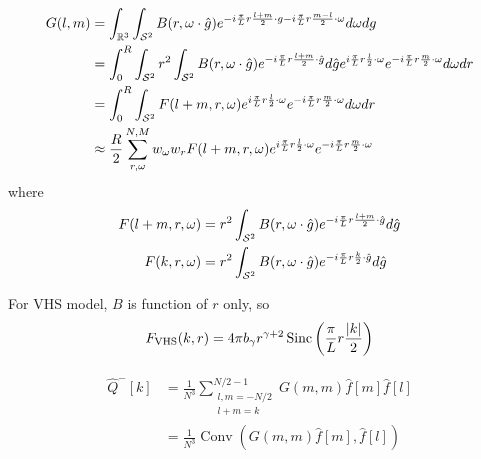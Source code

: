\documentclass[11pt]{amsart}
\begin{document}
\begin{align*}
\begin{split}
G(l,m)  &= \int_{\mathbb{R}^3} \int_{\mathcal{S}^2}B(r,\omega \cdot \hat g)  e^{-i{\pi \over L}r\frac{l+m}{2} \cdot g -i {\pi \over L} r \frac{m-l}{2}\cdot \omega}d\omega dg \\
& = \int_{0}^R \int_{\mathcal{S}^2}   r^2 \int_{\mathcal{S}^2} B(r,\omega \cdot \hat g) e^{-i{\pi \over L}r\frac{l+m}{2}\cdot \hat g}d\hat g e^{i {\pi \over L} r \frac{l}{2}\cdot \omega}e^{-i {\pi \over L} r \frac{m}{2}\cdot \omega}d\omega dr \\
& = \int_{0}^R \int_{\mathcal{S}^2}  F(l+m,r,\omega) e^{i {\pi \over L} r \frac{l}{2}\cdot \omega}e^{-i {\pi \over L} r \frac{m}{2}\cdot \omega}d\omega dr \\
&\approx \frac{R}{2}\sum_{r, \omega}^{N,M}w_\omega w_r F(l+m,r,\omega) e^{i {\pi \over L} r \frac{l}{2}\cdot \omega}e^{-i {\pi \over L} r \frac{m}{2}\cdot \omega}\\
\end{split}
\end{align*}
where
\begin{align*}
\begin{split}
 F(l+m,r,\omega) &= r^2 \int_{\mathcal{S}^2} B(r,\omega \cdot \hat g) e^{-i{\pi \over L}r\frac{l+m}{2}\cdot \hat g}d\hat g \\
  F(k,r,\omega) &= r^2 \int_{\mathcal{S}^2} B(r,\omega \cdot \hat g) e^{-i{\pi \over L}r\frac{k}{2}\cdot \hat g}d\hat g 
 \end{split}
\end{align*}

For VHS model, $B$ is function of $r$ only, so 
\begin{align*}
\begin{split}
 F_\text{VHS}(k,r) = 4\pi b_\gamma r^{\gamma+2}\operatorname{Sinc}\left( {\pi \over L}r \frac{|k|}{2} \right)
 \end{split}
\end{align*}


\color{blue}
\begin{align*}\begin{split}
\hat Q^{-}[k] &=  \frac{1}{N^3} \sum_{\substack{l,m= -N/2 \\ l+m = k}}^{N/2-1} G(m,m)\hat f[m] \hat f[l]\\
&= \frac{1}{N^3}\operatorname{Conv}(G(m,m)\hat f[m], \hat f[l])
\end{split}\end{align*}
\end{document}
